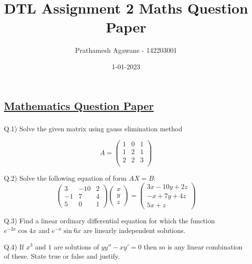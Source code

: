 \documentclass[a4paper,12pt,oneside,article]{memoir}
\title{DTL Assignment 2  Maths Question Paper}
\author{Prathamesh Agawane - 142203001}
\date{1-01-2023}
\begin{document}
\maketitle
\newpage

\begin{center}
	\chapter*{\uline{Mathematics Question Paper}}
\end{center}

\subsection{}
Q.1) Solve the given matrix using gauss elimination method

\[
A=
\begin{pmatrix}
1 & 0 & 1\\
1 & 2  & 1\\
2 & 2 &  3\\
\end{pmatrix}
\]

Q.2) Solve the following equation of form $AX=B$:
$$\begin{pmatrix}
            3  & -10 & 2 \\
            -1 &   7 & 4 \\
            5  &   0 & 1
        \end{pmatrix}
        \begin{pmatrix}
            x\\ y\\ z
        \end{pmatrix}
        =
        \begin{pmatrix}
           3x-10y+2z \\
           -x+7y+4z \\
           5x+z
        \end{pmatrix}$$

\begin{flushleft}
Q.3) Find a linear ordinary differential equation for which the function $e^{-2x}\cos{4x}$ and $e^{-x}\sin{6x}$ are linearly independent solutions.
\end{flushleft}

\begin{flushleft}
Q.4) If $x^3$ and $1$ are solutions of $yy''-xy'=0$ then so is any linear combination of these. State true or false and justify.
\end{flushleft}
\end{document}

